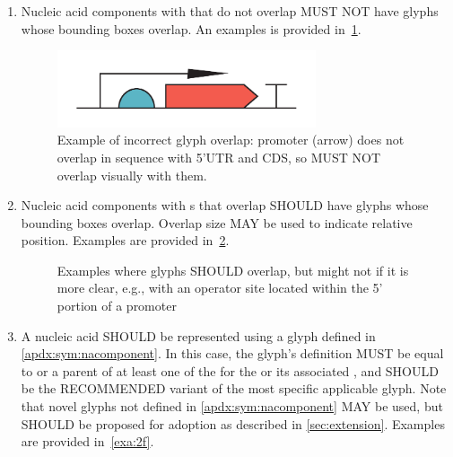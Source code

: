 \begin{enumerate}
\item Nucleic acid components with  that do not overlap MUST NOT have glyphs whose bounding boxes overlap.
	An examples is provided in~\ref{exa:2d}.
	\begin{figure}[h!]
	\centering
	\includegraphics[width=3in]{figures/examples/2d.pdf}
	\caption{Example of incorrect glyph overlap: promoter (arrow) does not overlap in sequence with 5'UTR and CDS, so MUST NOT overlap visually with them.}
	\label{exa:2d}
	\end{figure}

\item Nucleic acid components with s that overlap SHOULD have glyphs whose bounding boxes overlap.  Overlap size MAY be used to indicate relative position.
	Examples are provided in~\ref{exa:2e}.

	\begin{figure}[h!]
	\centering
	\caption{Examples where glyphs SHOULD overlap, but might not if it is more clear, e.g., with an operator site located within the 5' portion of a promoter}
	\label{exa:2e}
	\end{figure}

\item A nucleic acid  SHOULD be represented using a glyph defined in \ref{apdx:sym:nacomponent}.  In this case, the glyph's definition MUST be equal to or a parent of at least one of the  for the  or its associated , and SHOULD be the RECOMMENDED variant of the most specific applicable glyph.  Note that novel glyphs not defined in \ref{apdx:sym:nacomponent} MAY be used, but SHOULD be proposed for adoption as described in \ref{sec:extension}.
	Examples are provided in~\ref{exa:2f}.


\end{enumerate}
